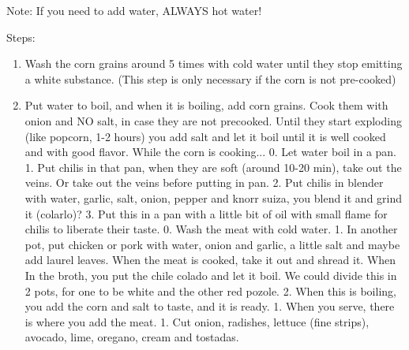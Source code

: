 \documentclass[12pt]{article}
\begin{document}
Note: If you need to add water, ALWAYS hot water!

Steps:
\begin{enumerate}
\setlength\itemsep{0em}
    \item Wash the corn grains around 5 times with cold water until they stop emitting a white substance. (This step is only necessary if the corn is not pre-cooked) 
    \item Put water to boil, and when it is boiling, add corn grains. Cook them with onion and NO salt, in case they are not precooked. Until they start exploding (like popcorn, 1-2 hours) you add salt and let it boil until it is well cooked and with good flavor.
 While the corn is cooking...
 0. Let water boil in a pan.
  1. Put chilis in that pan, when they are soft (around 10-20 min), take out the veins. Or take out the veins before putting in pan.
 2. Put chilis in blender with water, garlic, salt, onion, pepper and knorr suiza, you blend it and grind it (colarlo)?
 3. Put this in a pan with a little bit of oil with small flame for chilis to liberate their taste.
 0. Wash the meat with cold water.
 1. In another pot, put chicken or pork with water, onion and garlic, a little salt and maybe add laurel leaves. When the meat is cooked, take it out and shread it. When In the broth, you put the chile colado and let it boil.  We could divide this in 2 pots, for one to be white and the other red pozole.
 2. When this is boiling, you add the corn and salt to taste, and it is ready.
 1. When you serve, there is where you add the meat.
 1. Cut onion, radishes, lettuce (fine strips), avocado, lime, oregano, cream and tostadas.
\end{enumerate}
  
\end{document}
